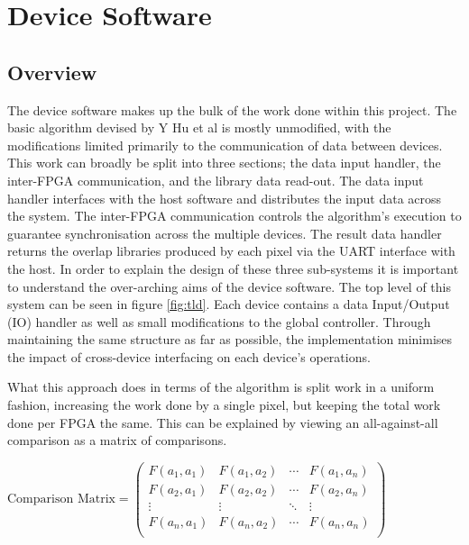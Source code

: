\section{Device Software}




\subsection{Overview}

The device software makes up the bulk of the work done within this project. The basic algorithm devised by Y Hu et al is mostly unmodified, with the modifications limited primarily to the communication of data between devices. This work can broadly be split into three sections; the data input handler, the inter-FPGA communication, and the library data read-out. The data input handler interfaces with the host software and distributes the input data across the system. The inter-FPGA communication controls the algorithm's execution to guarantee synchronisation across the multiple devices. The result data handler returns the overlap libraries produced by each pixel via the UART interface with the host. In order to explain the design of these three sub-systems it is important to understand the over-arching aims of the device software. The top level of this system can be seen in figure  \ref{fig:tld}. Each device contains a data Input/Output (IO) handler as well as small modifications to the global controller. Through maintaining the same structure as far as possible, the implementation minimises the impact of cross-device interfacing on each device's operations.

What this approach does in terms of the algorithm is split work in a uniform fashion, increasing the work done by a single pixel, but keeping the total work done per FPGA the same. This can be explained by viewing an all-against-all comparison as a matrix of comparisons.




$
\text{Comparison Matrix} =  
\begin{pmatrix}
  F(a_{1},a_{1}) & F(a_{1},a_{2})  & \cdots & F(a_{1},a_{n}) \\
  F(a_{2},a_{1}) & F(a_{2},a_{2})  & \cdots & F(a_{2},a_{n}) \\
  \vdots  & \vdots   & \ddots & \vdots   \\
  F(a_{n},a_{1}) & F(a_{n},a_{2}) & \cdots & F(a_{n},a_{n}) \\
 \end{pmatrix}  
 $
 
